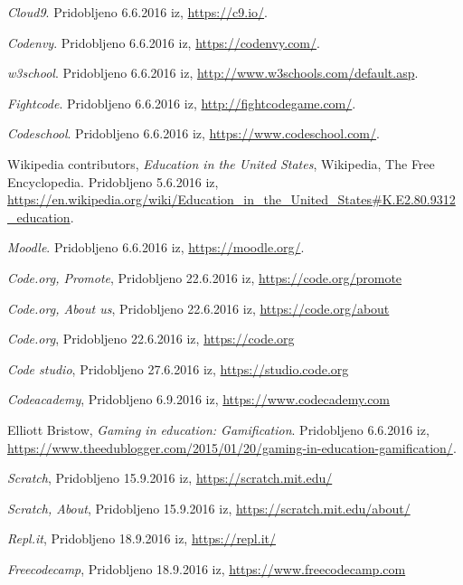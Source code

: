 \begin{thebibliography}{9}
 \emph{Cloud9}. Pridobljeno 6.6.2016 iz,
  \url{https://c9.io/}.

 \emph{Codenvy}. Pridobljeno 6.6.2016 iz,
  \url{https://codenvy.com/}.

 \emph{w3school}. Pridobljeno 6.6.2016 iz,
  \url{http://www.w3schools.com/default.asp}.

 \emph{Fightcode}. Pridobljeno 6.6.2016 iz,
  \url{http://fightcodegame.com/}.

 \emph{Codeschool}. Pridobljeno 6.6.2016 iz,
  \url{https://www.codeschool.com/}.

 Wikipedia contributors, \emph{Education in the
    United States}, Wikipedia, The Free Encyclopedia. Pridobljeno
  5.6.2016 iz,
  \url{https://en.wikipedia.org/wiki/Education_in_the_United_States#K.E2.80.9312_education}.

 \emph{Moodle}. Pridobljeno 6.6.2016 iz,
  \url{https://moodle.org/}.

 \emph{Code.org, Promote}, Pridobljeno
  22.6.2016 iz, \url{https://code.org/promote}

 \emph{Code.org, About us}, Pridobljeno
  22.6.2016 iz, \url{https://code.org/about}

 \emph{Code.org}, Pridobljeno
  22.6.2016 iz, \url{https://code.org}

 \emph{Code studio}, Pridobljeno
  27.6.2016 iz, \url{https://studio.code.org}

 \emph{Codeacademy}, Pridobljeno 6.9.2016 iz,
  \url{https://www.codecademy.com}

 Elliott Bristow, \emph{Gaming in education: Gamification}. Pridobljeno 6.6.2016 iz,
  \url{https://www.theedublogger.com/2015/01/20/gaming-in-education-gamification/}.

 \emph{Scratch}, Pridobljeno 15.9.2016 iz,
  \url{https://scratch.mit.edu/}

 \emph{Scratch, About}, Pridobljeno 15.9.2016 iz,
  \url{https://scratch.mit.edu/about/}

 \emph{Repl.it}, Pridobljeno 18.9.2016 iz,
  \url{https://repl.it/}

 \emph{Freecodecamp}, Pridobljeno 18.9.2016 iz,
  \url{https://www.freecodecamp.com}


\end{thebibliography}
